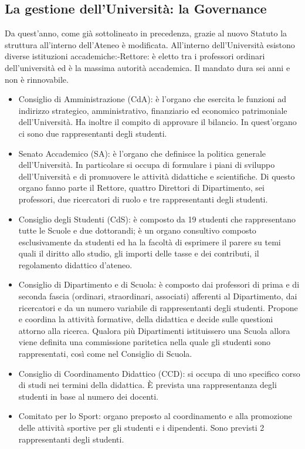 \subsection{La gestione dell’Università: la Governance}
Da quest'anno, come già sottolineato in precedenza, grazie al nuovo Statuto la struttura all'interno dell'Ateneo è modificata. All’interno dell’Università esistono diverse istituzioni accademiche:-Rettore: è eletto tra i professori ordinari dell’università ed è la massima autorità accademica. Il mandato dura sei anni e non è rinnovabile.
\begin{itemize}
   \item Consiglio di Amministrazione (CdA): è l'organo che esercita le funzioni ad indirizzo strategico,  amministrativo, finanziario ed economico patrimoniale dell'Università. Ha inoltre il compito di approvare il bilancio. In quest'organo ci sono due rappresentanti degli studenti.
   \item Senato Accademico (SA): è l'organo che definisce la politica generale dell'Università. In particolare si occupa di formulare i piani di sviluppo dell'Università e di promuovere le attività didattiche e scientifiche. Di questo organo fanno parte il Rettore, quattro Direttori di Dipartimento, sei professori, due ricercatori di ruolo e tre rappresentanti degli studenti.
   \item Consiglio degli Studenti (CdS): è composto da 19 studenti che rappresentano tutte le Scuole e due dottorandi; è un organo consultivo composto esclusivamente da studenti ed ha la facoltà di esprimere il parere su temi quali il diritto allo studio, gli importi delle tasse e dei contributi, il regolamento didattico d’ateneo.
   \item Consiglio di Dipartimento e di Scuola: è composto dai professori di prima e di seconda fascia (ordinari, straordinari, associati) afferenti al Dipartimento, dai ricercatori e da un numero variabile di rappresentanti degli studenti. Propone e coordina la attività formative, della didattica e decide sulle questioni attorno alla ricerca. Qualora più Dipartimenti istituissero una Scuola allora viene definita una commissione paritetica nella quale gli studenti sono rappresentati, così come nel Consiglio di Scuola.
   \item Consiglio di Coordinamento Didattico (CCD): si occupa di uno specifico corso di studi nei termini della didattica. È prevista una rappresentanza degli studenti in base al numero dei docenti.
   \item Comitato per lo Sport: organo preposto al coordinamento e alla promozione delle attività sportive per gli studenti e i dipendenti. Sono previsti 2 rappresentanti degli studenti.
\end{itemize}


